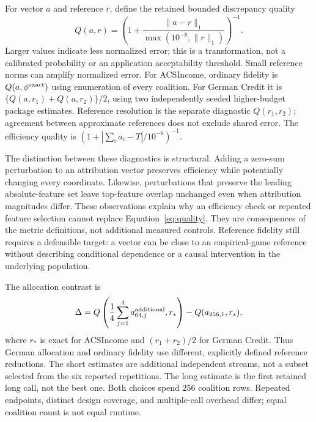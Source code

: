 \documentclass{article}
\newcommand{\quality}{Q}
\begin{document}
For vector $a$ and reference $r$, define the retained bounded discrepancy quality
\begin{equation}
\quality(a,r)=\left(1+\frac{\|a-r\|_1}{\max(10^{-8},\|r\|_1)}\right)^{-1}.
\label{eq:quality}
\end{equation}
Larger values indicate less normalized error; this is a transformation, not a calibrated probability or an application acceptability threshold. Small reference norms can amplify normalized error. For ACSIncome, ordinary fidelity is $\quality(a,\phi^{\rm exact})$ using enumeration of every coalition. For German Credit it is $\{\quality(a,r_1)+\quality(a,r_2)\}/2$, using two independently seeded higher-budget package estimates. Reference resolution is the separate diagnostic $\quality(r_1,r_2)$; agreement between approximate references does not exclude shared error. The efficiency quality is $(1+|\sum_i a_i-T|/10^{-6})^{-1}$.

The distinction between these diagnostics is structural. Adding a zero-sum perturbation to an attribution vector preserves efficiency while potentially changing every coordinate. Likewise, perturbations that preserve the leading absolute-feature set leave top-feature overlap unchanged even when attribution magnitudes differ. These observations explain why an efficiency check or repeated feature selection cannot replace Equation~\ref{eq:quality}. They are consequences of the metric definitions, not additional measured controls. Reference fidelity still requires a defensible target: a vector can be close to an empirical-game reference without describing conditional dependence or a causal intervention in the underlying population.

The allocation contrast is
\begin{equation}
\Delta=\quality\left(\frac{1}{4}\sum_{j=1}^{4}a^{\rm additional}_{64,j},r_*\right)
-\quality(a_{256,1},r_*),
\label{eq:allocation}
\end{equation}
where $r_*$ is exact for ACSIncome and $(r_1+r_2)/2$ for German Credit. Thus German allocation and ordinary fidelity use different, explicitly defined reference reductions. The short estimates are additional independent streams, not a subset selected from the six reported repetitions. The long estimate is the first retained long call, not the best one. Both choices spend 256 coalition rows. Repeated endpoints, distinct design coverage, and multiple-call overhead differ; equal coalition count is not equal runtime.
\end{document}
